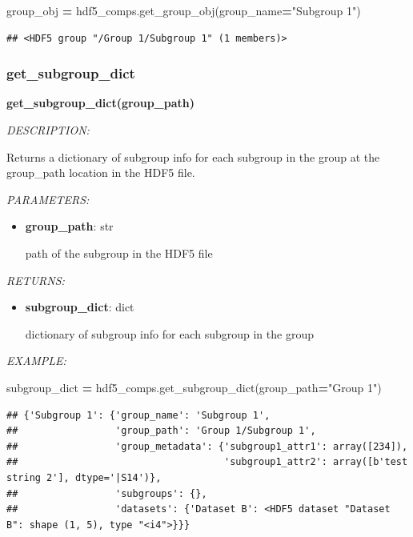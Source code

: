 \documentclass[
]{article}
\newenvironment{Shaded}{\begin{snugshade}}{\end{snugshade}}
\newcommand{\NormalTok}[1]{#1}
\newcommand{\OperatorTok}[1]{\textcolor[rgb]{0.81,0.36,0.00}{\textbf{#1}}}
\newcommand{\StringTok}[1]{\textcolor[rgb]{0.31,0.60,0.02}{#1}}
\begin{document}
\begin{Shaded}
\begin{Highlighting}[]
\NormalTok{group_obj }\OperatorTok{=}\NormalTok{ hdf5_comps.get_group_obj(group_name}\OperatorTok{=}\StringTok{"Subgroup 1"}\NormalTok{)}
\end{Highlighting}
\end{Shaded}

\begin{verbatim}
## <HDF5 group "/Group 1/Subgroup 1" (1 members)>
\end{verbatim}

\hypertarget{get_subgroup_dict}{%
\subsubsection{get\_subgroup\_dict}\label{get_subgroup_dict}}

\textbf{get\_subgroup\_dict(group\_path)}

\emph{DESCRIPTION:}

Returns a dictionary of subgroup info for each subgroup in the group at the group\_path location in the HDF5 file.

\emph{PARAMETERS:}

\begin{itemize}
\item
  \textbf{group\_path}: str

  path of the subgroup in the HDF5 file
\end{itemize}

\emph{RETURNS:}

\begin{itemize}
\item
  \textbf{subgroup\_dict}: dict

  dictionary of subgroup info for each subgroup in the group
\end{itemize}

\emph{EXAMPLE:}

\begin{Shaded}
\begin{Highlighting}[]
\NormalTok{subgroup_dict }\OperatorTok{=}\NormalTok{ hdf5_comps.get_subgroup_dict(group_path}\OperatorTok{=}\StringTok{"Group 1"}\NormalTok{)}
\end{Highlighting}
\end{Shaded}

\begin{verbatim}
## {'Subgroup 1': {'group_name': 'Subgroup 1',
##                 'group_path': 'Group 1/Subgroup 1',
##                 'group_metadata': {'subgroup1_attr1': array([234]),
##                                    'subgroup1_attr2': array([b'test string 2'], dtype='|S14')},
##                 'subgroups': {},
##                 'datasets': {'Dataset B': <HDF5 dataset "Dataset B": shape (1, 5), type "<i4">}}}
\end{verbatim}
\end{document}
